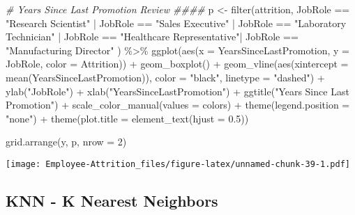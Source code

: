 \documentclass[
]{article}
\newenvironment{Shaded}{\begin{snugshade}}{\end{snugshade}}
\newcommand{\AttributeTok}[1]{\textcolor[rgb]{0.77,0.63,0.00}{#1}}
\newcommand{\CommentTok}[1]{\textcolor[rgb]{0.56,0.35,0.01}{\textit{#1}}}
\newcommand{\DecValTok}[1]{\textcolor[rgb]{0.00,0.00,0.81}{#1}}
\newcommand{\FloatTok}[1]{\textcolor[rgb]{0.00,0.00,0.81}{#1}}
\newcommand{\FunctionTok}[1]{\textcolor[rgb]{0.00,0.00,0.00}{#1}}
\newcommand{\NormalTok}[1]{#1}
\newcommand{\OtherTok}[1]{\textcolor[rgb]{0.56,0.35,0.01}{#1}}
\newcommand{\SpecialCharTok}[1]{\textcolor[rgb]{0.00,0.00,0.00}{#1}}
\newcommand{\StringTok}[1]{\textcolor[rgb]{0.31,0.60,0.02}{#1}}
\begin{document}
\begin{Shaded}
\begin{Highlighting}[]
\CommentTok{\# Years Since Last Promotion Review \#\#\#\#}
\NormalTok{p }\OtherTok{\textless{}{-}} \FunctionTok{filter}\NormalTok{(attrition, JobRole }\SpecialCharTok{==} \StringTok{"Research Scientist"} \SpecialCharTok{|}\NormalTok{ JobRole }\SpecialCharTok{==} \StringTok{"Sales Executive"}  \SpecialCharTok{|}\NormalTok{ JobRole }\SpecialCharTok{==} \StringTok{"Laboratory Technician"} \SpecialCharTok{|}\NormalTok{ JobRole }\SpecialCharTok{==} \StringTok{"Healthcare Representative"}\SpecialCharTok{|}\NormalTok{ JobRole }\SpecialCharTok{==} \StringTok{"Manufacturing Director"}\NormalTok{ ) }\SpecialCharTok{\%\textgreater{}\%}
  \FunctionTok{ggplot}\NormalTok{(}\FunctionTok{aes}\NormalTok{(}\AttributeTok{x =}\NormalTok{ YearsSinceLastPromotion, }\AttributeTok{y =}\NormalTok{ JobRole, }\AttributeTok{color =}\NormalTok{ Attrition)) }\SpecialCharTok{+}
  \FunctionTok{geom\_boxplot}\NormalTok{() }\SpecialCharTok{+}
  \FunctionTok{geom\_vline}\NormalTok{(}\FunctionTok{aes}\NormalTok{(}\AttributeTok{xintercept =} \FunctionTok{mean}\NormalTok{(YearsSinceLastPromotion)), }\AttributeTok{color =} \StringTok{"black"}\NormalTok{, }\AttributeTok{linetype =} \StringTok{"dashed"}\NormalTok{) }\SpecialCharTok{+}
  \FunctionTok{ylab}\NormalTok{(}\StringTok{"JobRole"}\NormalTok{) }\SpecialCharTok{+}
  \FunctionTok{xlab}\NormalTok{(}\StringTok{"YearsSinceLastPromotion"}\NormalTok{) }\SpecialCharTok{+}
  \FunctionTok{ggtitle}\NormalTok{(}\StringTok{"Years Since Last Promotion"}\NormalTok{) }\SpecialCharTok{+}
  \FunctionTok{scale\_color\_manual}\NormalTok{(}\AttributeTok{values =}\NormalTok{ colors) }\SpecialCharTok{+}
  \FunctionTok{theme}\NormalTok{(}\AttributeTok{legend.position =} \StringTok{"none"}\NormalTok{) }\SpecialCharTok{+}
  \FunctionTok{theme}\NormalTok{(}\AttributeTok{plot.title =} \FunctionTok{element\_text}\NormalTok{(}\AttributeTok{hjust =} \FloatTok{0.5}\NormalTok{)) }


\FunctionTok{grid.arrange}\NormalTok{(y, p, }\AttributeTok{nrow =} \DecValTok{2}\NormalTok{)}
\end{Highlighting}
\end{Shaded}

\texttt{[image: Employee-Attrition\_files/figure-latex/unnamed-chunk-39-1.pdf]}

\hypertarget{knn---k-nearest-neighbors}{%
\subsection{KNN - K Nearest Neighbors}\label{knn---k-nearest-neighbors}}
\end{document}
